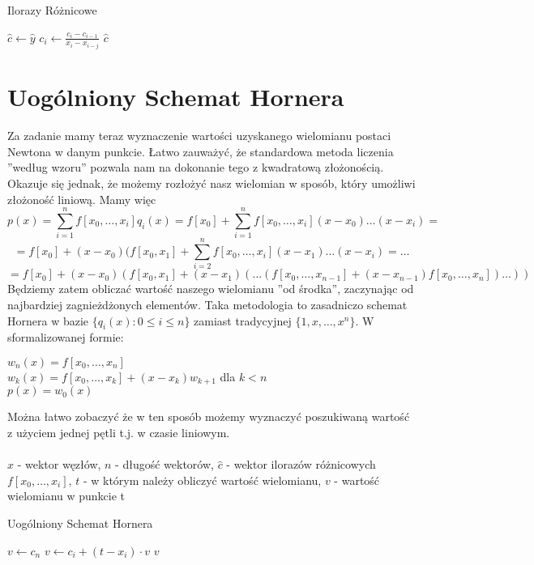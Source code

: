\documentclass[10pt]{article}
\begin{document}
\begin{algorithm}[H]
\caption{Ilorazy Różnicowe}\label{alg:cap}
\begin{algorithmic}
    \State $\hat{c} \gets \hat{y}$
            \State $c_i \gets \frac{c_i - c_{i-1}}{x_i - x_{i-j}}$
        \EndFor
    \EndFor
    \State \Return $\hat{c}$
    \EndFunction
\end{algorithmic}
\end{algorithm}

\section{Uogólniony Schemat Hornera}
Za zadanie mamy teraz wyznaczenie wartości uzyskanego wielomianu postaci Newtona w danym punkcie. Łatwo zauważyć, że standardowa metoda liczenia ”według wzoru” pozwala nam na dokonanie tego z kwadratową złożonością. Okazuje się jednak, że możemy rozłożyć nasz wielomian w sposób, który umożliwi złożoność liniową. Mamy więc
\[p(x) = \sum_{i=1}^n f[x_0,\dots,x_i]q_i(x) = f[x_0] + \sum_{i=1}^n f[x_0,\dots,x_i](x-x_0)\dots(x-x_i) =\]
\[= f[x_0] + (x- x_0)(f[x_0, x_1] + \sum_{i=2}^n f[x_0,\dots,x_i] (x-x_1)\dots(x-x_i) =\dots\]
\[= f[x_0] + (x - x_0)(f[x_0, x_1] + (x - x_1)(\dots(f[x_0,\dots,x_{n-1}] + (x - x_{n-1}) f[x_0,\dots,x_n])\dots))\]
Będziemy zatem obliczać wartość naszego wielomianu ”od środka”, zaczynając od najbardziej zagnieżdżonych elementów. Taka metodologia to zasadniczo schemat Hornera w bazie $\{q_i(x) : 0 \leq i \leq n\}$ zamiast tradycyjnej $\{1, x, \dots,x^n\}$. W sformalizowanej formie:
\begin{center}
    $w_n(x) = f[x_0,\dots,x_n]$\\
    $w_k(x) = f[x_0,\dots,x_k] + (x - x_k)w_{k+1}$ dla $k < n$\\
    $p(x) = w_0(x)$
\end{center}
Można łatwo zobaczyć że w ten sposób możemy wyznaczyć poszukiwaną wartość z użyciem jednej pętli t.j. w czasie liniowym.\\\\
$\hat{x}$ - wektor węzłów, $n$ - długość wektorów, $\hat{c}$ - wektor ilorazów różnicowych $f[x_0,\dots,x_i]$, $t$ - w którym należy obliczyć wartość wielomianu, $v$ - wartość wielomianu w punkcie t

\begin{algorithm}[H]
\caption{Uogólniony Schemat Hornera}\label{alg:cap}
\begin{algorithmic}
    \State $v \gets c_n$
        \State $v \gets c_i + (t - x_i)\cdot v$
    \EndFor
    \State \Return $v$
    \EndFunction
\end{algorithmic}
\end{algorithm}
\end{document}
